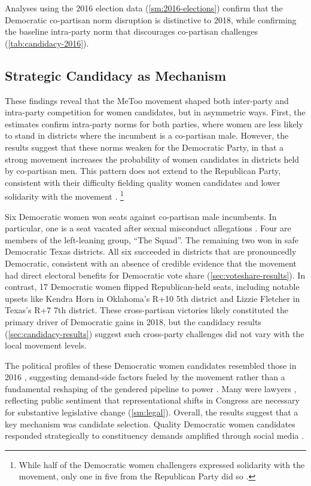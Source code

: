 \documentclass[manuscript,screen,nonacm,11pt,acm]{acmart}
\newcommand{\D}{Democratic}
\begin{document}
Analyses using the 2016 election data (\cref{sm:2016-elections}) confirm that the Democratic co-partisan norm disruption is distinctive to 2018, while confirming the baseline intra-party norm that discourages co-partisan challenges (\cref{tab:candidacy-2016}).

\subsection{Strategic Candidacy as Mechanism}
These findings reveal that the MeToo movement shaped both inter-party and intra-party competition for women candidates, but in asymmetric ways.
First, the estimates confirm intra-party norms for both parties, where women are less likely to stand in districts where the incumbent is a co-partisan male.
However, the results suggest that these norms weaken for the Democratic Party, in that a strong movement increases the probability of women candidates in districts held by co-partisan men.
This pattern does not extend to the Republican Party, consistent with their difficulty fielding quality women candidates \citep{thomsen2020, CarsonHitefield2018} and lower solidarity with the movement \citep{dittmar2020}.%
\footnote{While half of the Democratic women challengers expressed solidarity with the movement, only one in five from the Republican Party did so \citep{dittmar2020}.}

Six Democratic women won seats against co-partisan male incumbents.
In particular, one is a seat vacated after sexual misconduct allegations \citep{nyt2018}.
Four are members of the left-leaning group, ``The Squad''.
The remaining two won in safe \D{} Texas districts.
All six succeeded in districts that are pronouncedly \D{}, consistent with an absence of credible evidence that the movement had direct electoral benefits for Democratic vote share (\cref{sec:voteshare-results}).
In contrast, 17 Democratic women flipped Republican-held seats, including notable upsets like Kendra Horn in Oklahoma's R+10 5th district and Lizzie Fletcher in Texas's R+7 7th district.
These cross-partisan victories likely constituted the primary driver of Democratic gains in 2018, but the candidacy results (\cref{sec:candidacy-results}) suggest such cross-party challenges did not vary with the local movement levels.

The political profiles of these Democratic women candidates resembled those in 2016 \citep{thomsen2020}, suggesting demand-side factors fueled by the movement rather than a fundamental reshaping of the gendered pipeline to power \citep{Safarpour2022, CarsonHitefield2018, Lucas2021, dittmar2020, DeMora2023, Gibson2019, thomsen2020}.
Many were lawyers \citep{thomsen2020}, reflecting public sentiment that representational shifts in Congress are necessary for substantive legislative change (\cref{sm:legal}).
Overall, the results suggest that a key mechanism was candidate selection.
Quality Democratic women candidates \citep{CarsonHitefield2018} responded strategically to constituency demands amplified through social media \citep{wholeads2019}.
\end{document}
